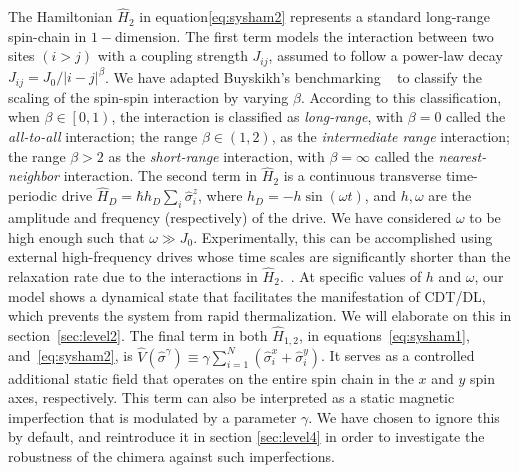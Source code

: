 \documentclass[12pt]{iopart}
\begin{document}
The Hamiltonian $\hat{H}_2$ in equation\eqref{eq:sysham2} represents a standard long-range spin-chain in $1-$dimension. The first term models the interaction between two sites $(i>j)$ with a coupling strength $J_{ij}$, assumed to follow a power-law decay $J_{ij}={J_0}/{|i-j|^\beta}$. We have adapted Buyskikh's benchmarking ~\cite{buyskikh_entanglement_2016} to classify the scaling of the spin-spin interaction by varying $\beta$. According to this classification, when $\beta\in\left[0,1\right)$, the interaction is classified as \textit{long-range}, with $\beta=0$ called the \textit{all-to-all} interaction; the range $\beta\in \left(1,2\right)$, as the \textit{ intermediate range} interaction; the range $\beta > 2$ as the \textit{ short-range} interaction, with $\beta= \infty$ called the \textit{ nearest-neighbor} interaction. The second term in $\hat{H}_2$ is a continuous transverse time-periodic drive $\displaystyle \hat{H}_D=\hbar h_D \sum_i\hat{\sigma}^z_i$, where $\displaystyle h_D = -h\sin{(\omega t)}$, and $h,\omega$ are the amplitude and frequency (respectively) of the drive. We have considered $\omega$ to be high enough such that $\omega\gg J_0$. 	Experimentally, this can be accomplished using external high-frequency drives whose time scales are significantly shorter than the relaxation rate due to the interactions in $\hat{H}_2$.~\cite{choi_observation_2017,zhang_observation_2017,Cirac_1995,Blatt_2012}. At specific values of $h$ and $\omega$, our model shows a dynamical state that facilitates the manifestation of CDT/DL, which prevents the system from rapid thermalization. We will elaborate on this in section~\ref{sec:level2}. The final term in both $\hat{H}_{1,2}$, in equations~\eqref{eq:sysham1}, and~\eqref{eq:sysham2}, is $\displaystyle \hat{V}(\hat{\sigma}^{\gamma}) \equiv\gamma  \sum_{i=1}^{N} (\hat{\sigma}^x_i + \hat{\sigma}^y_i)$. It serves as a controlled additional static field that operates on the entire spin chain in the $x$ and $y$ spin axes, respectively.  This term can also be interpreted as a static magnetic imperfection that is modulated by a parameter $\gamma$. We have chosen to ignore this by default, and reintroduce it in section \ref{sec:level4} in order to investigate the robustness of the chimera against such imperfections.
\end{document}
